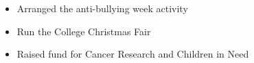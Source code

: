 \documentclass[10pt,a4paper,ragged2e]{altacv}
\begin{document}
\divider


\begin{itemize}

\item Arranged the anti-bullying week activity
\item Run the College Christmas Fair
\item Raised fund for Cancer Research and Children in Need

\end{itemize}

\divider







\clearpage


\nocite{*}






\end{document}
